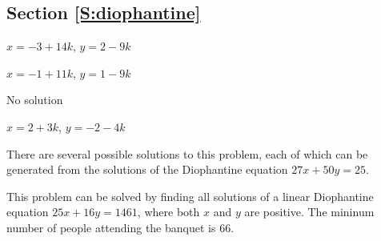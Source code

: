 \subsection*{Section \ref{S:diophantine}}

\begin{multicols}{2}
\begin{list}{\bf{\ref{exer:sec83-2}.}}
\item \begin{list}{\bf{(a)}}
\item $x = -3 + 14k$, $y = 2 - 9k$
\end{list}
\end{list}

\begin{list}{}
\item \begin{list}{\bf{(b)}}
\item $x = -1 + 11k$, $y = 1 - 9k$
\end{list}
\end{list}

\begin{list}{}
\item \begin{list}{\bf{(c)}}
\item No solution
\end{list}
\end{list}

\begin{list}{}
\item \begin{list}{\bf{(d)}}
\item $x = 2+3k$, $y = -2-4k$
\end{list}
\end{list}
\end{multicols}


\begin{list}{\bf{\ref{exer:balancing}.}}
\item There are several possible solutions to this problem, each of which can be generated from the solutions of the Diophantine equation \linebreak
$27x + 50y = 25$.
\end{list}

\begin{list}{\bf{\ref{exer:sec83-5}.}}
\item This problem can be solved by finding all solutions of a linear Diophantine equation $25x + 16y = 1461$, where both $x$ and $y$ are positive.  The mininum number of people attending the banquet is 66.
\end{list}


